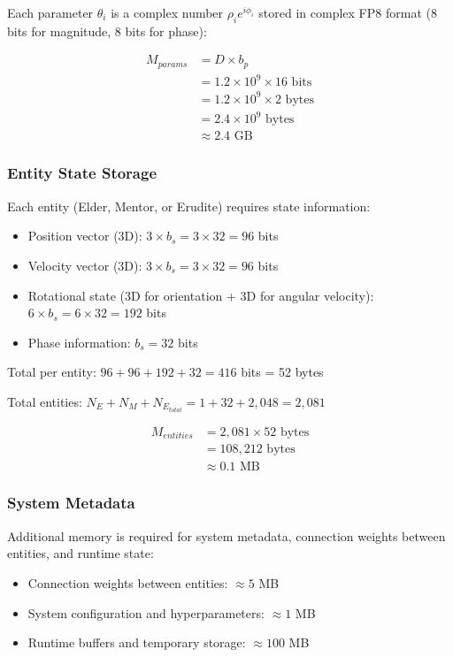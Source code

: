 Each parameter $\theta_i$ is a complex number $\rho_i e^{i\phi_i}$ stored in complex FP8 format (8 bits for magnitude, 8 bits for phase):

\begin{align}
M_{params} &= D \times b_p \\
&= 1.2 \times 10^9 \times 16 \text{ bits} \\
&= 1.2 \times 10^9 \times 2 \text{ bytes} \\
&= 2.4 \times 10^9 \text{ bytes} \\
&\approx 2.4 \text{ GB}
\end{align}

\subsubsection{Entity State Storage}

Each entity (Elder, Mentor, or Erudite) requires state information:
\begin{itemize}
    \item Position vector (3D): $3 \times b_s = 3 \times 32 = 96$ bits
    \item Velocity vector (3D): $3 \times b_s = 3 \times 32 = 96$ bits
    \item Rotational state (3D for orientation + 3D for angular velocity): $6 \times b_s = 6 \times 32 = 192$ bits
    \item Phase information: $b_s = 32$ bits
\end{itemize}

Total per entity: $96 + 96 + 192 + 32 = 416$ bits = 52 bytes

Total entities: $N_E + N_M + N_{E_{total}} = 1 + 32 + 2,048 = 2,081$

\begin{align}
M_{entities} &= 2,081 \times 52 \text{ bytes} \\
&= 108,212 \text{ bytes} \\
&\approx 0.1 \text{ MB}
\end{align}

\subsubsection{System Metadata}

Additional memory is required for system metadata, connection weights between entities, and runtime state:
\begin{itemize}
    \item Connection weights between entities: $\approx 5$ MB
    \item System configuration and hyperparameters: $\approx 1$ MB
    \item Runtime buffers and temporary storage: $\approx 100$ MB
\end{itemize}

